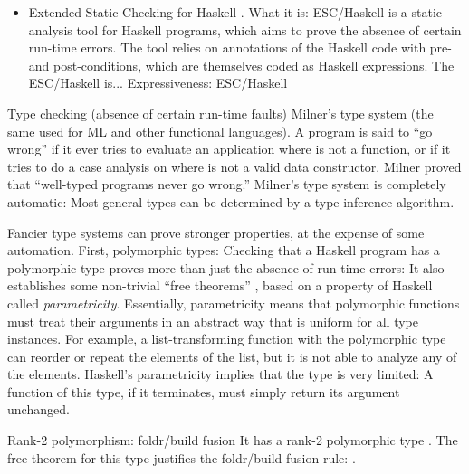 \begin{itemize}

\item Extended Static Checking for Haskell \cite{Xu06}. What it is: ESC/Haskell is a static analysis tool for Haskell programs, which aims to prove the absence of certain run-time errors. The tool relies on annotations of the Haskell code with pre- and post-conditions, which are themselves coded as Haskell expressions. The ESC/Haskell is... Expressiveness: ESC/Haskell

\end{itemize}

Type checking (absence of certain run-time faults)
\cite{Milner78} Milner's type system (the same used for ML and other functional languages). A program is said to ``go wrong'' if it ever tries to evaluate an application  where  is not a function, or if it tries to do a case analysis on  where  is not a valid data constructor. Milner proved that ``well-typed programs never go wrong.'' Milner's type system is completely automatic: Most-general types can be determined by a type inference algorithm.

Fancier type systems can prove stronger properties, at the expense of some automation. First, polymorphic types: Checking that a Haskell program has a polymorphic type proves more than just the absence of run-time errors: It also establishes some non-trivial ``free theorems'' \cite{Wadler89Free}, based on a property of Haskell called \emph{parametricity}. Essentially, parametricity means that polymorphic functions must treat their arguments in an abstract way that is uniform for all type instances. For example, a list-transforming function with the polymorphic type  can reorder or repeat the elements of the list, but it is not able to analyze any of the elements. Haskell's parametricity implies that the type  is very limited: A function of this type, if it terminates, must simply return its argument unchanged.

Rank-2 polymorphism: foldr/build fusion \cite{ShortCut93}  It has a rank-2 polymorphic type . The free theorem for this type justifies the foldr/build fusion rule: .

